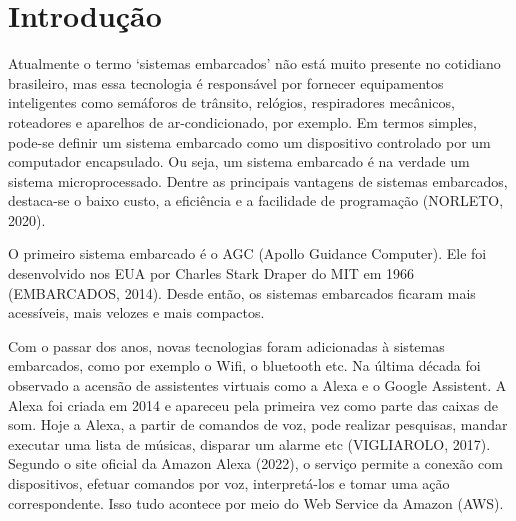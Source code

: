 \documentclass[
    12pt,
    openright,
    twoside,
    a4paper,
    english,
    spanish,
    brazil,
    ]{abntex2}
\begin{document}
\frenchspacing


\imprimircapa

\imprimirfolhaderosto

\begin{dedicatoria}
\end{dedicatoria}

\begin{agradecimentos}
\end{agradecimentos}

\tableofcontents*
\cleardoublepage

\textual

\chapter{Introdução}
Atualmente o termo ‘sistemas embarcados’ não está muito presente no cotidiano brasileiro, mas essa tecnologia é responsável por fornecer equipamentos inteligentes como semáforos de trânsito, relógios, respiradores mecânicos, roteadores e aparelhos de ar-condicionado, por exemplo. Em termos simples, pode-se definir um sistema embarcado como um dispositivo controlado por um computador encapsulado. Ou seja, um sistema embarcado é na verdade um sistema microprocessado. Dentre as principais vantagens de sistemas embarcados, destaca-se o baixo custo, a eficiência e a facilidade de programação (NORLETO, 2020).

O primeiro sistema embarcado é o AGC (Apollo Guidance Computer). Ele foi desenvolvido nos EUA por Charles Stark Draper do MIT em 1966 (EMBARCADOS, 2014). Desde então, os sistemas embarcados ficaram mais acessíveis, mais velozes e mais compactos.

Com o passar dos anos, novas tecnologias foram adicionadas à sistemas embarcados, como por exemplo o Wifi, o bluetooth etc. Na última década foi observado a acensão de assistentes virtuais como a Alexa e o Google Assistent. A Alexa foi criada em 2014 e apareceu pela primeira vez como parte das caixas de som. Hoje a Alexa, a partir de comandos de voz, pode realizar pesquisas, mandar executar uma lista de músicas, disparar um alarme etc (VIGLIAROLO, 2017). Segundo o site oficial da Amazon Alexa (2022), o serviço permite a conexão com dispositivos, efetuar comandos por voz, interpretá-los e tomar uma ação correspondente. Isso tudo acontece por meio do Web Service da Amazon (AWS).
\end{document}
